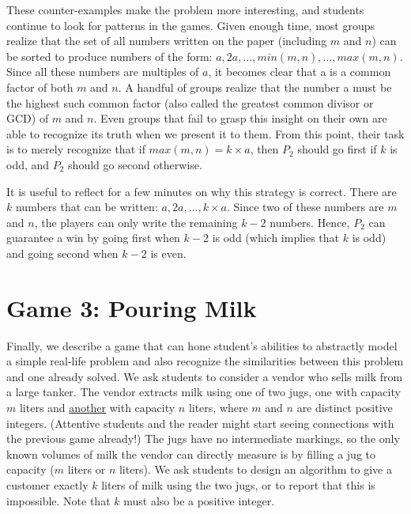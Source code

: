 \begin{multicols}{2}
{These counter-examples make the problem more interesting, and students continue to look for patterns in the games. Given enough time, most groups realize that the set of all numbers written on the paper (including $m$ and $n$) can  be sorted to produce numbers of the form: $a, 2a, ..., min(m, n), ..., max(m, n)$. Since all these numbers are multiples of $a$, it becomes clear that a is a common factor of both $m$ and $n$. A handful of groups realize that the number a must be the highest such common factor (also called the greatest common divisor or GCD) of $m$ and $n$. Even groups that fail to grasp this insight on their own are able to recognize its truth when we present it to them. From this point, their task is to merely recognize that if $max(m, n) = k \times a$, then $P_{2}$ should go first if $k$ is odd, and $P_{2}$ should go second otherwise.

It is useful to reflect for a few minutes on why this strategy is correct. There are $k$ numbers that can be written: $a, 2a, …, k \times a$. Since two of these numbers are $m$ and $n$, the players can only write the remaining $k - 2$ numbers. Hence, $P_{2}$ can guarantee a win by going first when $k - 2$ is odd (which implies that $k$ is odd) and going second when $k - 2$ is even.

\section{Game 3: Pouring Milk}\label{section-5}

Finally, we describe a game that can hone student's abilities to abstractly model a simple real-life problem and also recognize the similarities between this problem and one already solved. We ask students to consider a vendor who sells milk from a large tanker. The vendor extracts milk using one of two jugs, one with capacity $m$ liters and \underline{another} with capacity $n$ liters, where $m$ and $n$ are distinct positive integers. (Attentive students and the reader might start seeing connections with the previous game already!) The jugs have no intermediate markings, so the only known volumes of milk the vendor can directly measure is by filling a jug to capacity ($m$ liters or $n$ liters). We ask students to design an algorithm to give a customer exactly $k$ liters of milk using the two jugs, or to report that this is impossible. Note that $k$ must also be a positive integer.

}
\end{multicols}
